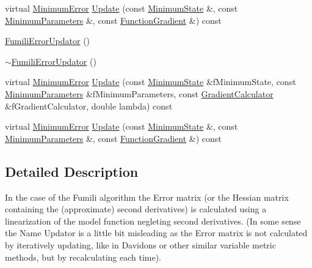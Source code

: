 \begin{DoxyCompactItemize}
\item 
virtual \mbox{\hyperlink{classROOT_1_1Minuit2_1_1MinimumError}{Minimum\+Error}} \mbox{\hyperlink{classROOT_1_1Minuit2_1_1FumiliErrorUpdator_a7a634a18816d8cdc6db8d92b27b69095}{Update}} (const \mbox{\hyperlink{classROOT_1_1Minuit2_1_1MinimumState}{Minimum\+State}} \&, const \mbox{\hyperlink{classROOT_1_1Minuit2_1_1MinimumParameters}{Minimum\+Parameters}} \&, const \mbox{\hyperlink{classROOT_1_1Minuit2_1_1FunctionGradient}{Function\+Gradient}} \&) const
\item 
\mbox{\hyperlink{classROOT_1_1Minuit2_1_1FumiliErrorUpdator_a6f6a3c5b10d58710f4d26b431e89907b}{Fumili\+Error\+Updator}} ()
\item 
\mbox{\hyperlink{classROOT_1_1Minuit2_1_1FumiliErrorUpdator_a601351a2ef04f881819b0115f88696e5}{$\sim$\+Fumili\+Error\+Updator}} ()
\item 
virtual \mbox{\hyperlink{classROOT_1_1Minuit2_1_1MinimumError}{Minimum\+Error}} \mbox{\hyperlink{classROOT_1_1Minuit2_1_1FumiliErrorUpdator_a8aea4f3c69cee306853aee2b9f302b76}{Update}} (const \mbox{\hyperlink{classROOT_1_1Minuit2_1_1MinimumState}{Minimum\+State}} \&f\+Minimum\+State, const \mbox{\hyperlink{classROOT_1_1Minuit2_1_1MinimumParameters}{Minimum\+Parameters}} \&f\+Minimum\+Parameters, const \mbox{\hyperlink{classROOT_1_1Minuit2_1_1GradientCalculator}{Gradient\+Calculator}} \&f\+Gradient\+Calculator, double lambda) const
\item 
virtual \mbox{\hyperlink{classROOT_1_1Minuit2_1_1MinimumError}{Minimum\+Error}} \mbox{\hyperlink{classROOT_1_1Minuit2_1_1FumiliErrorUpdator_a7a634a18816d8cdc6db8d92b27b69095}{Update}} (const \mbox{\hyperlink{classROOT_1_1Minuit2_1_1MinimumState}{Minimum\+State}} \&, const \mbox{\hyperlink{classROOT_1_1Minuit2_1_1MinimumParameters}{Minimum\+Parameters}} \&, const \mbox{\hyperlink{classROOT_1_1Minuit2_1_1FunctionGradient}{Function\+Gradient}} \&) const
\end{DoxyCompactItemize}


\subsection{Detailed Description}
In the case of the Fumili algorithm the Error matrix (or the Hessian matrix containing the (approximate) second derivatives) is calculated using a linearization of the model function negleting second derivatives. (In some sense the Name Updator is a little bit misleading as the Error matrix is not calculated by iteratively updating, like in Davidon\textquotesingle{}s or other similar variable metric methods, but by recalculating each time).

